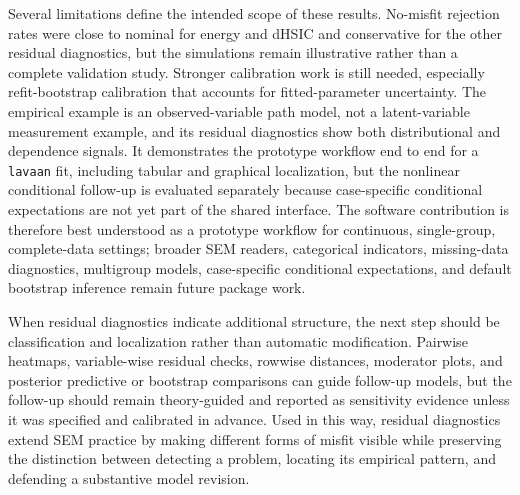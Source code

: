 \documentclass[floatsintext,a4paper]{apa7} %
\begin{document}
	Several limitations define the intended scope of these results. No-misfit rejection rates were close to nominal for energy and dHSIC and conservative for the other residual diagnostics, but the simulations remain illustrative rather than a complete validation study. Stronger calibration work is still needed, especially refit-bootstrap calibration that accounts for fitted-parameter uncertainty. The empirical example is an observed-variable path model, not a latent-variable measurement example, and its residual diagnostics show both distributional and dependence signals. It demonstrates the prototype workflow end to end for a \texttt{lavaan} fit, including tabular and graphical localization, but the nonlinear conditional follow-up is evaluated separately because case-specific conditional expectations are not yet part of the shared interface. The software contribution is therefore best understood as a prototype workflow for continuous, single-group, complete-data settings; broader SEM readers, categorical indicators, missing-data diagnostics, multigroup models, case-specific conditional expectations, and default bootstrap inference remain future package work.
	
	When residual diagnostics indicate additional structure, the next step should be classification and localization rather than automatic modification. Pairwise heatmaps, variable-wise residual checks, rowwise distances, moderator plots, and posterior predictive or bootstrap comparisons can guide follow-up models, but the follow-up should remain theory-guided and reported as sensitivity evidence unless it was specified and calibrated in advance. Used in this way, residual diagnostics extend SEM practice by making different forms of misfit visible while preserving the distinction between detecting a problem, locating its empirical pattern, and defending a substantive model revision.
	
	
	
	
	
	
	
	
	
	
	
	
	\printbibliography
\end{document}
